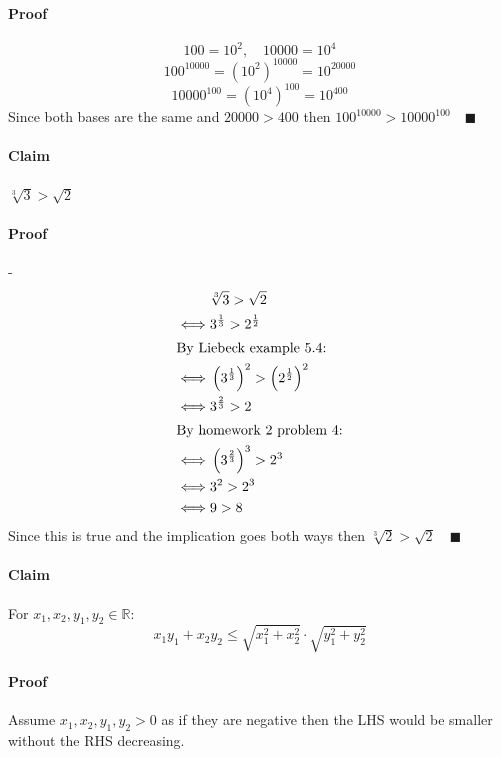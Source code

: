 \documentclass{article}
\newcommand{\bb}[1]{\mathbb{#1}}
\newcounter{example}[section]
\begin{document}
\paragraph{Proof} \[100=10^2,\quad10000=10^4\]
\[100^{10000}=(10^2)^{10000}=10^{20000}\]
\[10000^{100}=(10^4)^{100}=10^{400}\]
Since both bases are the same and \(20000>400\) then \(100^{10000}>10000^{100}\quad\blacksquare\)

\paragraph{Claim} \(\sqrt[3]{3}>\sqrt 2\)

\paragraph{Proof} -
\begin{align*}
&\sqrt[3]{3}>\sqrt 2\\
\iff&3^{\frac 13}>2^{\frac 12}\\
\intertext{By Liebeck example 5.4:}
\iff&\left(3^{\frac 13}\right)^2>\left(2^{\frac 12}\right)^2\\
\iff&3^{\frac 23}>2\\
\intertext{By homework 2 problem 4:}
\iff&\left(3^{\frac 23}\right)^3>2^3\\
\iff&3^2>2^3\\
\iff&9>8
\end{align*}
Since this is true and the implication goes both ways then \(\sqrt[3]2>\sqrt 2\quad\blacksquare\)

\paragraph{Claim} For \(x_1,x_2,y_1,y_2\in\bb R\):
\[x_1y_1+x_2y_2\le\sqrt{x_1^2+x_2^2}\cdot\sqrt{y_1^2+y_2^2}\]

\paragraph{Proof} Assume \(x_1,x_2,y_1,y_2>0\) as if they are negative then the LHS would be smaller without the RHS decreasing.
\end{document}
